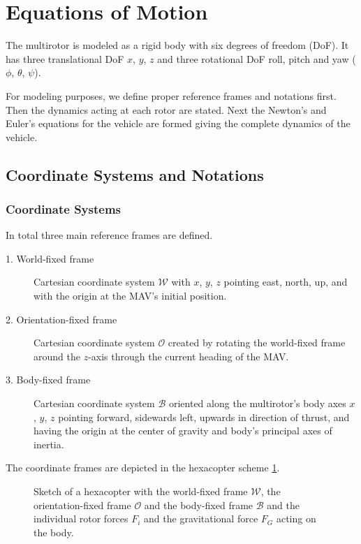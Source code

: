 \section{Equations of Motion}
\label{sec:eq_of_motion}
The multirotor is modeled as a rigid body with six degrees of freedom (DoF). It has three translational DoF $x$, $y$, $z$ and three rotational DoF roll, pitch and yaw ($\phi$, $\theta$, $\psi$).

 For modeling purposes, we define proper reference frames and notations first. Then the dynamics acting at each rotor are stated. Next the Newton's and Euler's equations for the vehicle are formed giving the complete dynamics of the vehicle.

\subsection{Coordinate Systems and Notations}
\label{sec:coordinates}
\subsubsection{Coordinate Systems}
In total three main reference frames are defined. 
\begin{description}
\item[1. World-fixed frame] Cartesian coordinate system $\mathcal{W}$ with $x$, $y$, $z$ pointing east, north, up, and with the origin at the MAV's initial position.
\item[2. Orientation-fixed frame] Cartesian coordinate system $\mathcal{O}$ created by rotating the world-fixed frame around the $z$-axis through the current heading of the MAV. 
\item[3. Body-fixed frame] Cartesian coordinate system $\mathcal{B}$ oriented along the multirotor's body axes $x$, $y$, $z$ pointing forward, sidewards left, upwards in direction of thrust, and having the origin at the center of gravity and body's principal axes of inertia.
\end{description}

The coordinate frames are depicted in the hexacopter scheme \ref{fig:hexa}.


\begin{figure}
   \centering
   \def\svgwidth{0.75\textwidth}
   
   \caption{Sketch of a hexacopter with the world-fixed frame $\mathcal{W}$, the orientation-fixed frame $\mathcal{O}$ and the body-fixed frame $\mathcal{B}$ and the individual rotor forces $F_{i}$ and the gravitational force $F_G$ acting on the body.}
   \label{fig:hexa}
\end{figure}


